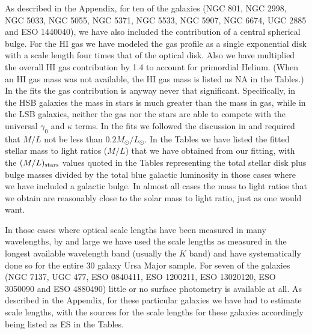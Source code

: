 \documentclass[preprint,aps]{revtex4}
\begin{document}
As described in the Appendix, for ten of the galaxies (NGC 801, NGC 2998, NGC 5033, NGC 5055, NGC 5371, NGC 5533, NGC 5907, NGC 6674, UGC 2885 and ESO 1440040), we have also included the contribution of a central spherical bulge. For the HI gas we have modeled the gas profile as a single exponential disk with a scale length four times that of the optical disk. Also we have multiplied the overall HI gas contribution by 1.4 to account for primordial Helium. (When an HI gas mass was not available, the HI gas mass is listed as NA in the Tables.) In the fits the gas contribution is anyway never that significant. Specifically, in the HSB galaxies the mass in stars is much greater than the mass in gas, while in the LSB galaxies, neither the gas nor the stars are able to compete with the universal $\gamma_0$ and $\kappa$ terms. In the fits we followed the discussion in \cite{Sanders1996} and required that $M/L$ not be less than $0.2M_{\odot}/L_{\odot}$. In the Tables we have listed the fitted stellar mass to light ratios  ($M/L$) that we have obtained from our fitting,  with the $(M/L)_{\rm stars}$ values quoted in the Tables representing the total stellar disk plus bulge masses divided by the total blue galactic luminosity in those cases where we have included a galactic bulge.  In almost all cases the mass to light ratios that we obtain are reasonably close to the solar mass to light ratio, just as one would want.



In those cases where optical scale lengths have been measured in many wavelengths, by and large we have used the scale lengths as measured in the longest available wavelength band (usually the $K$ band) and have systematically  done so for the entire 30 galaxy Ursa Major sample. For seven of the galaxies  (NGC 7137, UGC 477, ESO 0840411, ESO 1200211, ESO 13020120, ESO 3050090 and ESO 4880490) little or no surface photometry is available at all. As described in the Appendix, for these particular galaxies we have had to estimate scale lengths, with the sources for the scale lengths for these galaxies accordingly being listed as ES in the Tables.
\end{document}
